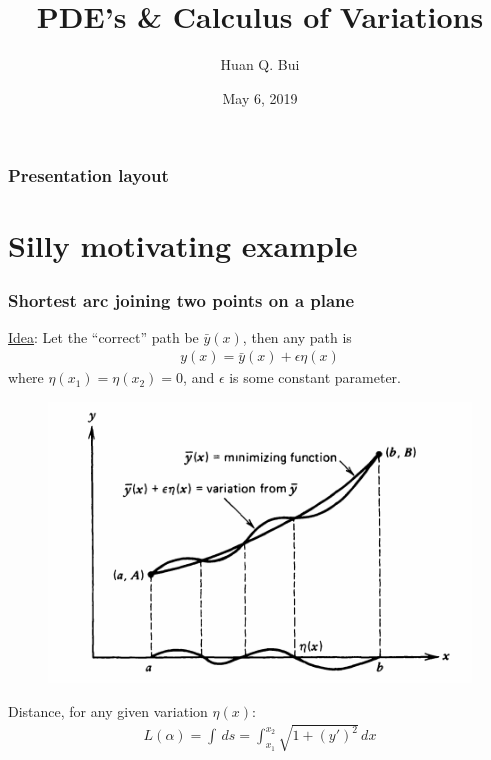 \documentclass{beamer}
\title{PDE's \& Calculus of Variations}
\author[Huan Q. Bui] %
{Huan Q. Bui}
\institute[Colby College] %
{
	
	MA411: PDE
	\and
	Professor Evan Randles
}
\date{May 6, 2019}
\theoremstyle{definition}
\begin{document}
 
\frame{\titlepage}







 
\begin{frame}
\frametitle{Presentation layout}
\tableofcontents
\end{frame}


\section{Silly motivating example}

\begin{frame}
\frametitle{Shortest arc joining two points on a plane}
\pause
\underline{Idea}: Let the ``correct'' path be $\bar{y}(x)$, then any path is
\begin{align*}
y(x) = \bar{y}(x) + \epsilon \eta(x)
\end{align*} 
where $\eta(x_1) = \eta(x_2) = 0$, and $\epsilon$ is some constant parameter. 
\pause
\begin{figure}[h!]
	\centering
	\includegraphics[scale=0.4]{path.png}
\end{figure}
\pause
Distance, for any given variation $\eta(x)$:
\begin{align*}
L(\alpha) = \int\,ds = \int^{x_2}_{x_1}\sqrt{1+(y')^2}\,dx
\end{align*}

\end{frame}
\end{document}
